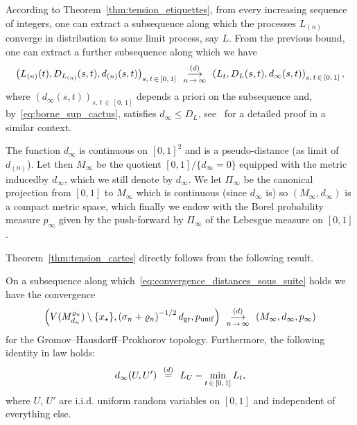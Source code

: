 \documentclass[AHL,Unicode,longabstracts,published]{cedram}
\newcommand{\1}{\ensembles{1}}
\renewcommand{\le}{\leqslant}
\newcommand{\dgr}{d_{\mathrm{gr}}}
\newcommand{\pgr}{p_{\mathrm{unif}}}
\newcommand{\Vmn}{V(M_{d_n}^{\varrho_n})}
\newcommand{\cvloi}[1][n]{\enskip\mathop{\longrightarrow}^{(d)}_{#1\,\to\, \infty}\enskip}
\newcommand{\eqloi}{\enskip\mathop{=}^{(d)}\enskip}
\begin{document}
According to Theorem~\ref{thm:tension_etiquettes}, from every increasing sequence of integers, one can extract a subsequence along which the processes $L_{(n)}$ converge in distribution to some limit process, say $L$. From the previous bound, one can extract a further subsequence along which we have
\begin{equation}\label{eq:convergence_distances_sous_suite}
\left(L_{(n)}(t), D_{L_{(n)}}(s, t), d_{(n)}(s, t)\right)_{s,\,t\,\in\,[0,\,1]}
\cvloi \left(L_t, D_L(s,t), d_\infty(s,t)\right)_{s,\,t\,\in\,[0,\,1]},
\end{equation}
where $(d_\infty(s,t))_{s,\,t\,\in\,[0,\,1]}$ depends a priori on the subsequence and, by~\eqref{eq:borne_sup_cactus}, satisfies $d_\infty \le D_L$, see~\cite[Proposition~3.2]{LG07} for a detailed proof in a similar context.

The function $d_\infty$ is continuous on $[0,1]^2$ and is a pseudo-distance (as limit of $d_{(n)}$). Let then $M_\infty$ be the quotient $[0,1] / \{d_\infty=0\}$ equipped with the metric induced\linebreak by $d_\infty$, which we still denote by $d_\infty$. We let $\Pi_\infty$ be the canonical projection from $[0,1]$ to $M_\infty$ which is continuous (since $d_\infty$ is) so $(M_\infty, d_\infty)$ is a compact metric space, which finally we endow with the Borel probability measure $p_\infty$ given by the push-forward by $\Pi_\infty$ of the Lebesgue measure on $[0,1]$.

Theorem~\ref{thm:tension_cartes} directly follows from the following result.


\begin{prop}\label{prop:limite_sous_suite_carte}
On a subsequence along which~\eqref{eq:convergence_distances_sous_suite} holds we have the convergence
\[
\left(\Vmn\setminus\{x_\star\}, \left(\sigma_n + \varrho_n\right)^{-1/2} \dgr, \pgr\right) \cvloi \left(M_\infty, d_\infty, p_\infty\right)
\]
for the Gromov--Hausdorff--Prokhorov topology. Furthermore, the following identity in law holds:
\begin{equation}\label{eq:distance_points_unif_carte_sous_suite}
d_\infty(U,U') \eqloi L_U - \min_{t\,\in\,[0,\,1]} L_t,
\end{equation}
where $U$, $U'$ are i.i.d. uniform random variables on $[0,1]$ and independent of everything else.
\end{prop}
\end{document}
